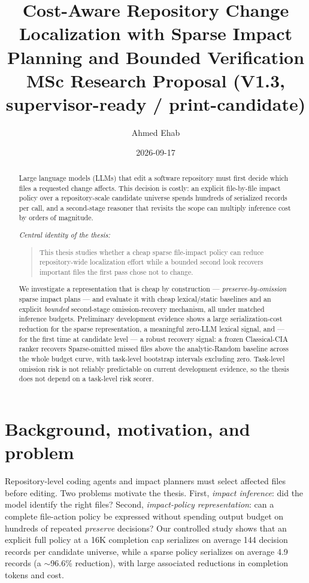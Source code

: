 \documentclass[11pt,a4paper]{article}
\title{\textbf{Cost-Aware Repository Change Localization with Sparse Impact\\[2pt]
Planning and Bounded Verification}\\[6pt]
\large MSc Research Proposal (V1.3, supervisor-ready / print-candidate)}
\author{Ahmed Ehab}
\date{2026-09-17}
\begin{document}
\maketitle

\begin{abstract}
Large language models (LLMs) that edit a software repository must first decide
which files a requested change affects. This decision is costly: an explicit
file-by-file impact policy over a repository-scale candidate universe spends
hundreds of serialized records per call, and a second-stage reasoner that
revisits the scope can multiply inference cost by orders of magnitude.

\emph{Central identity of the thesis:}

\begin{quote}
This thesis studies whether a cheap sparse file-impact policy can reduce
repository-wide localization effort while a bounded second look recovers
important files the first pass chose not to change.
\end{quote}

We investigate a representation that is cheap by construction ---
\emph{preserve-by-omission} sparse impact plans --- and evaluate it with cheap
lexical/static baselines and an explicit \emph{bounded} second-stage
omission-recovery mechanism, all under matched inference budgets. Preliminary
development evidence shows a large serialization-cost reduction for the sparse
representation, a meaningful zero-LLM lexical signal, and --- for the first
time at candidate level --- a robust recovery signal: a frozen Classical-CIA
ranker recovers Sparse-omitted missed files above the analytic-Random baseline
across the whole budget curve, with task-level bootstrap intervals excluding
zero. Task-level omission risk is not reliably predictable on current
development evidence, so the thesis does not depend on a task-level risk scorer.
\end{abstract}

\section{Background, motivation, and problem}
\label{sec:background}

Repository-level coding agents and impact planners must select affected files
before editing. Two problems motivate the thesis. First, \emph{impact
inference}: did the model identify the right files? Second,
\emph{impact-policy representation}: can a complete file-action policy be
expressed without spending output budget on hundreds of repeated
\emph{preserve} decisions? Our controlled study shows that an explicit full
policy at a 16K completion cap serializes on average 144 decision records per
candidate universe, while a sparse policy serializes on average 4.9 records (a
$\sim$96.6\% reduction), with large associated reductions in completion tokens
and cost.
\end{document}
